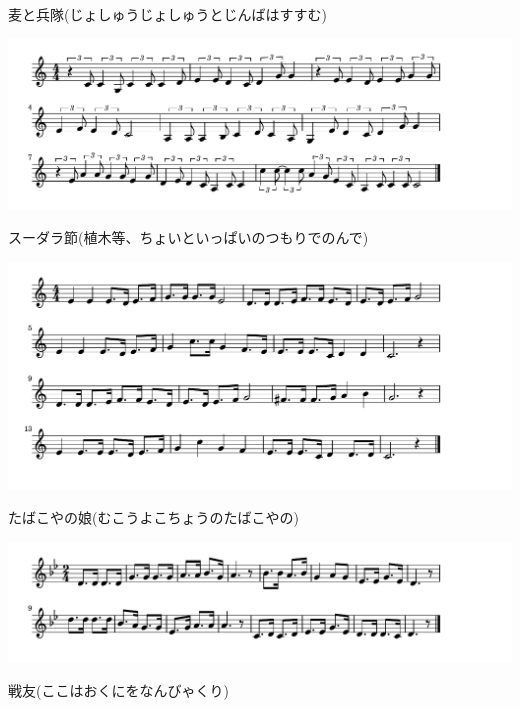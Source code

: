 \documentclass[a4paper]{ltjsarticle}
\begin{document}
\vspace{-10mm} \hspace{10mm}
麦と兵隊(じょしゅうじょしゅうとじんばはすすむ)

\includegraphics[clip]{sudarabushi_crop.pdf}

\vspace{-10mm} \hspace{10mm}
スーダラ節(植木等、ちょいといっぱいのつもりでのんで)

\includegraphics[clip]{tabakoya_crop.pdf}

\vspace{-10mm} \hspace{10mm}
たばこやの娘(むこうよこちょうのたばこやの)


\includegraphics[clip]{senyu_crop.pdf}

\vspace{-10mm} \hspace{10mm}
戦友(ここはおくにをなんびゃくり)
\end{document}
